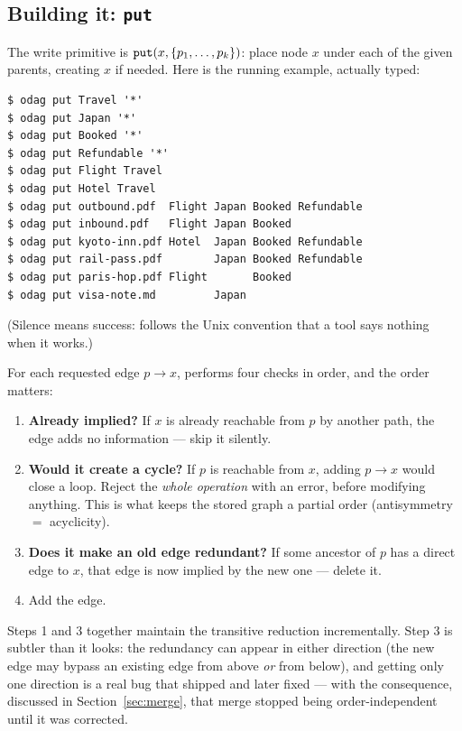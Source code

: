 \subsection{Building it: \texttt{put}}
\label{sec:put}

The write primitive is $\texttt{put}(x, \{p_1, \dots, p_k\})$: place node $x$
under each of the given parents, creating $x$ if needed. Here is the running
example, actually typed:

\begin{lstlisting}
$ odag put Travel '*'
$ odag put Japan '*'
$ odag put Booked '*'
$ odag put Refundable '*'
$ odag put Flight Travel
$ odag put Hotel Travel
$ odag put outbound.pdf  Flight Japan Booked Refundable
$ odag put inbound.pdf   Flight Japan Booked
$ odag put kyoto-inn.pdf Hotel  Japan Booked Refundable
$ odag put rail-pass.pdf        Japan Booked Refundable
$ odag put paris-hop.pdf Flight       Booked
$ odag put visa-note.md         Japan
\end{lstlisting}

\noindent (Silence means success:  follows the Unix convention that
a tool says nothing when it works.)

For each requested edge $p \to x$,  performs four checks in order,
and the order matters:

\begin{enumerate}[leftmargin=1.7em]
\item \textbf{Already implied?} If $x$ is already reachable from $p$ by
  another path, the edge adds no information --- skip it silently.
\item \textbf{Would it create a cycle?} If $p$ is reachable from $x$, adding
  $p \to x$ would close a loop. Reject the \emph{whole operation} with an
  error, before modifying anything. This is what keeps the stored graph a
  partial order (antisymmetry $=$ acyclicity).
\item \textbf{Does it make an old edge redundant?} If some ancestor of $p$ has
  a direct edge to $x$, that edge is now implied by the new one --- delete it.
\item Add the edge.
\end{enumerate}

Steps 1 and 3 together maintain the transitive reduction incrementally. Step 3
is subtler than it looks: the redundancy can appear in either direction
(the new edge may bypass an existing edge from above \emph{or} from below),
and getting only one direction is a real bug that \odag{} shipped and later
fixed --- with the consequence, discussed in Section~\ref{sec:merge}, that
merge stopped being order-independent until it was corrected.

